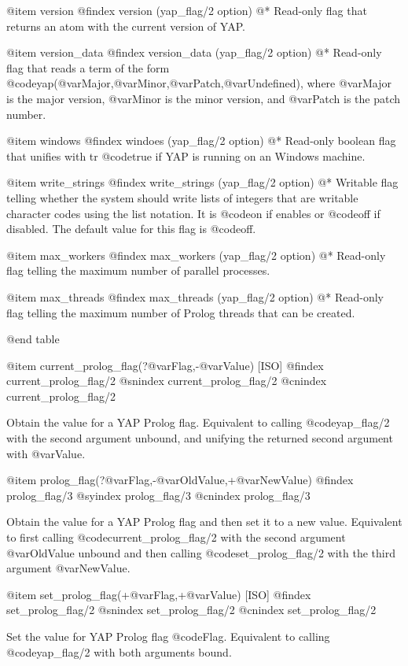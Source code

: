 {{{{{{{{@item version
@findex version (yap_flag/2 option)
@* Read-only flag that returns an atom with the current version of
YAP.

@item version_data
@findex version_data (yap_flag/2 option)
@* Read-only flag that reads a term of the form
@code{yap}(@var{Major},@var{Minor},@var{Patch},@var{Undefined}), where
@var{Major} is the major version, @var{Minor} is the minor version,
and @var{Patch} is the patch number.

@item  windows
@findex windoes (yap_flag/2 option)
@* 
Read-only boolean flag that unifies with tr @code{true} if YAP is
running on an Windows machine.

@item write_strings
@findex  write_strings (yap_flag/2 option)
@* Writable flag telling whether the system should write lists of
integers that are writable character codes using the list notation. It
is @code{on} if enables or @code{off} if disabled. The default value for
this flag is @code{off}.

@item max_workers
@findex  max_workers (yap_flag/2 option)
@* Read-only flag telling the maximum number of parallel processes.

@item max_threads
@findex  max_threads (yap_flag/2 option)
@* Read-only flag telling the maximum number of Prolog threads that can 
be created.

@end table

@item current_prolog_flag(?@var{Flag},-@var{Value}) [ISO]
@findex current_prolog_flag/2
@snindex current_prolog_flag/2
@cnindex current_prolog_flag/2

Obtain the value for a YAP Prolog flag. Equivalent to calling
@code{yap_flag/2} with the second argument unbound, and unifying the
returned second argument with @var{Value}.

@item prolog_flag(?@var{Flag},-@var{OldValue},+@var{NewValue})
@findex prolog_flag/3
@syindex prolog_flag/3
@cnindex prolog_flag/3

Obtain the value for a YAP Prolog flag and then set it to a new
value. Equivalent to first calling @code{current_prolog_flag/2} with the
second argument @var{OldValue} unbound and then calling
@code{set_prolog_flag/2} with the third argument @var{NewValue}.

@item set_prolog_flag(+@var{Flag},+@var{Value}) [ISO]
@findex set_prolog_flag/2
@snindex set_prolog_flag/2
@cnindex set_prolog_flag/2

Set the value for YAP Prolog flag @code{Flag}. Equivalent to
calling @code{yap_flag/2} with both arguments bound.


}}}}}}}}
